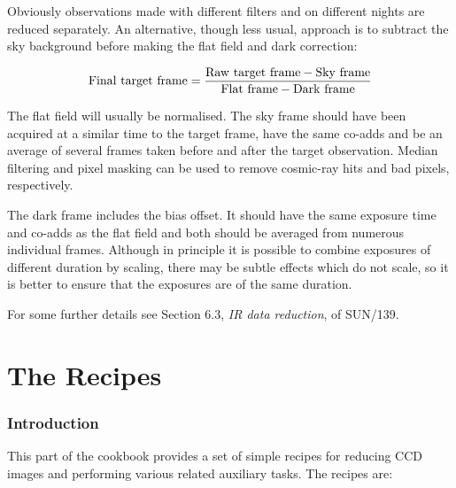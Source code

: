 \documentclass[twoside,11pt]{article}
\newcommand{\stardocinitials}  {SC}
\newcommand{\stardocnumber}    {5.3}
\newcommand{\stardocname}{\stardocinitials /\stardocnumber}
\newcommand{\xref}[3]{#1}
\newcommand{\xlabel}[1]{}
\begin{document}
Obviously observations made with different filters and on different nights
are reduced separately.  An alternative, though less usual, approach is to
subtract the sky background before making the flat field and dark
correction:

\begin{equation}
{\rm Final~target~frame} = 
\frac {{\rm Raw~target~frame} - {\rm Sky~frame}}
{{\rm Flat~frame} - {\rm Dark~frame}}
\end{equation}

The flat field will usually be normalised.  The sky frame should have 
been acquired at a similar time to the target frame, have the same co-adds
and be an average of several frames taken before and after the target
observation.  Median filtering and pixel masking can be used to remove
cosmic-ray hits and bad pixels, respectively.

The dark frame includes the bias offset.  It should have the same exposure
time and co-adds as the flat field and both should be averaged from
numerous individual frames.  Although in  principle it is possible to
combine exposures of different duration by scaling, there may be subtle
effects which do not scale, so it is better to ensure that the exposures
are of the same duration.

For some further details see 
\xref{Section 6.3, {\it IR data reduction}}{sun139}{IRreduction},
of \xref{SUN/139}{sun139}{}\/\cite{SUN139}.


\cleardoublepage
\markboth{\stardocname}{\stardocname}
\part{The Recipes}
\markboth{\stardocname}{\stardocname}
\section{\xlabel{SUMEX}\label{SUMEX}Introduction}

This part of the cookbook provides a set of simple recipes for reducing
CCD images and performing various related auxiliary tasks.  The
recipes are:
\end{document}
